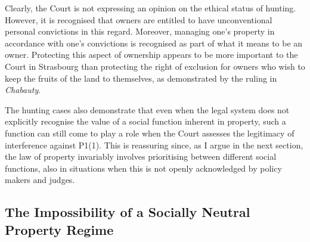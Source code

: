 Clearly, the Court is not expressing an opinion on the ethical status of hunting. However, it is recognised that owners are entitled to have unconventional personal convictions in this regard. Moreover, managing one's property in accordance with one's convictions is recognised as part of what it means to be an owner. Protecting this aspect of ownership appears to be more important to the Court in Strasbourg than protecting the right of exclusion for owners who wish to keep the fruits of the land to themselves, as demonstrated by the ruling in {\it Chabauty}. 

The hunting cases also demonstrate that even when the legal system does not explicitly recognise the value of a social function inherent in property, such a function can still come to play a role when the Court assesses the legitimacy of interference against P1(1). This is reassuring since, as I argue in the next section, the law of property invariably involves prioritising between different social functions, also in situations when this is not openly acknowledged by policy makers and judges.

\subsection{The Impossibility of a Socially Neutral Property Regime}\label{sec:2:4:2}

